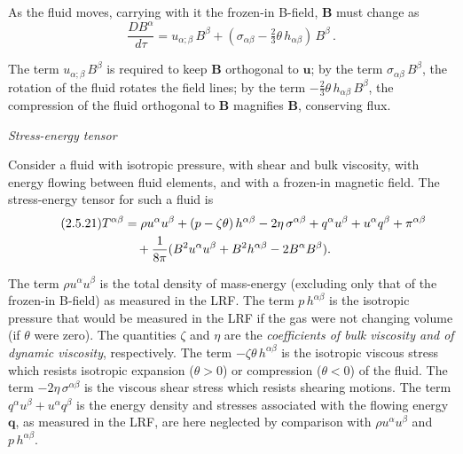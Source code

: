   As the fluid moves, carrying with it the
frozen-in B-field, $\mathbf{B}$ must change as
%
\begin{equation}
\tag{2.5.20}
\frac{DB^\alpha}{d\tau}
= u_{\alpha;\beta}\, B^\beta
  + (\sigma_{\alpha\beta} - \tfrac{2}{3}\theta\, h_{\alpha\beta})\, B^\beta\,.
\end{equation}

\noindent
The term $u_{\alpha;\beta}\, B^\beta$ is required to keep $\mathbf{B}$
orthogonal to $\mathbf{u}$; by the term $\sigma_{\alpha\beta}\, B^\beta$,
the rotation of the fluid rotates the field lines; by the term
$-\tfrac{2}{3}\theta\, h_{\alpha\beta}\, B^\beta$, the compression of the
fluid orthogonal to $\mathbf{B}$ magnifies $\mathbf{B}$, conserving
flux.

\bigskip
\noindent
\emph{Stress-energy tensor}

\smallskip
\noindent
Consider a fluid with isotropic pressure, with shear and bulk viscosity,
with energy flowing between fluid elements, and with a frozen-in
magnetic field.  The stress-energy tensor for such a fluid is
%
\begin{align}
\tag{2.5.21}
T^{\alpha\beta}
&= \rho u^\alpha u^\beta + (p - \zeta\theta)\, h^{\alpha\beta}
   - 2\eta\, \sigma^{\alpha\beta}
   + q^\alpha u^\beta + u^\alpha q^\beta + \pi^{\alpha\beta}
\notag \\
&\quad
   + \frac{1}{8\pi}(B^2 u^\alpha u^\beta + B^2 h^{\alpha\beta}
   - 2B^\alpha B^\beta).
\end{align}

\noindent
The term $\rho u^\alpha u^\beta$ is the total density of mass-energy
(excluding only that of the frozen-in B-field) as measured in the LRF.
The term $p\, h^{\alpha\beta}$ is the isotropic pressure that would be
measured in the LRF if the gas were not changing volume (if $\theta$
were zero).  The quantities $\zeta$ and $\eta$ are the
\emph{coefficients of bulk viscosity and of dynamic viscosity},
respectively.  The term $-\zeta\theta\, h^{\alpha\beta}$ is the
isotropic viscous stress which resists isotropic expansion
($\theta > 0$) or compression ($\theta < 0$) of the fluid.
The term $-2\eta\, \sigma^{\alpha\beta}$ is the viscous shear stress
which resists shearing motions.  The term
$q^\alpha u^\beta + u^\alpha q^\beta$ is the energy density and
stresses associated with the flowing energy $\mathbf{q}$, as measured
in the LRF, are here neglected by comparison with $\rho u^\alpha u^\beta$
and $p\, h^{\alpha\beta}$.

